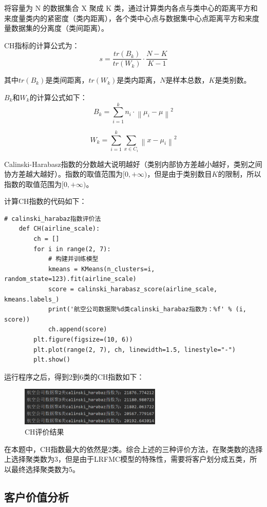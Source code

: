 \documentclass[UTF8,12pt]{article}
\begin{document}
将容量为 N 的数据集合 X 聚成 K 类，通过计算类内各点与类中心的距离平方和来度量类内的紧密度（类内距离），各个类中心点与数据集中心点距离平方和来度量数据集的分离度（类间距离）。

CH指标的计算公式为：
$$s=\frac{tr(B_k)}{tr(W_k)} \cdot \frac{N-K}{K-1}$$

其中$tr(B_k)$是类间距离，$tr(W_k)$是类内距离，$N$是样本总数，$K$是类别数。

$B_k$和$W_k$的计算公式如下：
$$B_k=\sum_{i=1}^k n_i \cdot \left \| \mu_i - \mu \right \|^2$$

$$W_k=\sum_{i=1}^k \sum_{x \in C_i} \left \| x - \mu_i \right \|^2$$

Calinski-Harabasz指数的分数越大说明越好（类别内部协方差越小越好，类别之间协方差越大越好）。指数的取值范围为$[0,+\infty)$，但是由于类别数目$K$的限制，所以指数的取值范围为$[0,+\infty)$。

计算CH指数的代码如下：

\begin{lstlisting}[title=CH评价,frame=shadowbox]
    # calinski_harabaz指数评价法
    def CH(airline_scale):
        ch = []
        for i in range(2, 7):
            # 构建并训练模型
            kmeans = KMeans(n_clusters=i, random_state=123).fit(airline_scale)
            score = calinski_harabasz_score(airline_scale, kmeans.labels_)
            print('航空公司数据聚%d类calinski_harabaz指数为：%f' % (i, score))
            ch.append(score)
        plt.figure(figsize=(10, 6))
        plt.plot(range(2, 7), ch, linewidth=1.5, linestyle="-")
        plt.show()
\end{lstlisting}

运行程序之后，得到2到6类的CH指数如下：
\begin{figure}[htbp]
    \centering
    \includegraphics[width=0.6\textwidth]{img/14.png}
    \caption{CH评价结果}
\end{figure}

在本题中，CH指数最大的依然是2类。综合上述的三种评价方法，在聚类数的选择上选择聚类数为3，但是由于LRFMC模型的特殊性，需要将客户划分成五类，所以最终选择聚类数为5。

\subsection{客户价值分析}
\end{document}
